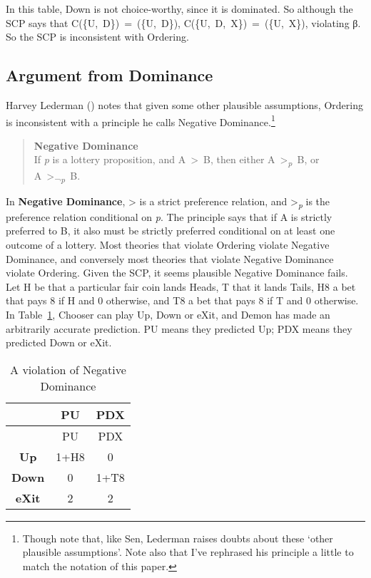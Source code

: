 \documentclass[
  10pt,
  letterpaper,
  DIV=11,
  numbers=noendperiod,
  twoside]{scrartcl}
\begin{document}
In this table, Down is not choice-worthy, since it is dominated. So
although the SCP says that C(\{U,~D\})~=~(\{U,~D\}),
C(\{U,~D,~X\})~=~(\{U,~X\}), violating β. So the SCP is inconsistent
with Ordering.

\subsection{Argument from Dominance}\label{sec-negdom}

Harvey Lederman () notes that given some
other plausible assumptions, Ordering is inconsistent with a principle
he calls Negative Dominance.\footnote{Though note that, like Sen,
  Lederman raises doubts about these `other plausible assumptions'. Note
  also that I've rephrased his principle a little to match the notation
  of this paper.}

\begin{quote}
\textbf{Negative Dominance}\\
If \emph{p} is a lottery proposition, and A~\textgreater~B, then either
A~\textgreater{}\textsubscript{\emph{p}}~B, or
A~\textgreater{}\textsubscript{¬\emph{p}}~B.
\end{quote}

In \textbf{Negative Dominance}, \textgreater{} is a strict preference
relation, and \textgreater{}\textsubscript{\emph{p}} is the preference
relation conditional on \emph{p}. The principle says that if A is
strictly preferred to B, it also must be strictly preferred conditional
on at least one outcome of a lottery. Most theories that violate
Ordering violate Negative Dominance, and conversely most theories that
violate Negative Dominance violate Ordering. Given the SCP, it seems
plausible Negative Dominance fails. Let H be that a particular fair coin
lands Heads, T that it lands Tails, H8 a bet that pays 8 if H and 0
otherwise, and T8 a bet that pays 8 if T and 0 otherwise. In
Table~\ref{tbl-negdom}, Chooser can play Up, Down or eXit, and Demon has
made an arbitrarily accurate prediction. PU means they predicted Up; PDX
means they predicted Down or eXit.

\begin{longtable}[]{@{}ccc@{}}
\caption{A violation of Negative
Dominance}\label{tbl-negdom}\tabularnewline
\toprule\noalign{}
& PU & PDX \\
\midrule\noalign{}
\endfirsthead
\toprule\noalign{}
& PU & PDX \\
\midrule\noalign{}
\endhead
\bottomrule\noalign{}
\endlastfoot
\textbf{Up} & 1+H8 & 0 \\
\textbf{Down} & 0 & 1+T8 \\
\textbf{eXit} & 2 & 2 \\
\end{longtable}
\end{document}
